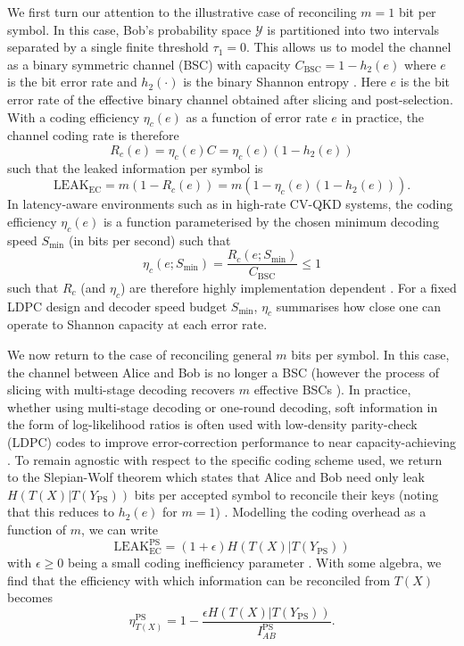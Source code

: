 ﻿\documentclass[12pt]{article}
\begin{document}
We first turn our attention to the illustrative case of reconciling $m = 1$ bit per symbol. In this case, Bob's probability space $\mathcal{Y}$ is partitioned into two intervals separated by a single finite threshold $\tau_1 = 0$. This allows us to model the channel as a binary symmetric channel (BSC) with capacity $C_\text{BSC} = 1 - h_2(e)$ where $e$ is the bit error rate and $h_2(\cdot)$ is the binary Shannon entropy \cite{Cover-2006}. Here $e$ is the bit error rate of the effective binary channel obtained after slicing and post-selection. With a coding efficiency $\eta_c(e)$ as a function of error rate $e$ in practice, the channel coding rate is therefore
\begin{equation}
  \label{eq: R_c}
  R_c(e) = \eta_c(e)C = \eta_c(e)(1 - h_2(e))
\end{equation}
such that the leaked information per symbol is 
\begin{equation}
\label{eq: LEAK EC}
\text{LEAK}_\text{EC} = m(1 - R_c(e)) = m(1 - \eta_c(e)(1 - h_2(e))).
\end{equation}
In latency-aware environments such as in high-rate CV-QKD systems, the coding efficiency $\eta_c(e)$ is a function parameterised by the chosen minimum decoding speed $S_\text{min}$ (in bits per second) such that
\begin{equation}
\label{eq: eta_c e Smin}
\eta_c(e; S_\text{min}) = \frac{R_c(e; S_\text{min})}{C_\text{BSC}} \leq 1
\end{equation}
such that $R_c$ (and $\eta_c$) are therefore highly implementation dependent \cite{Weerasinghe-2023}. For a fixed LDPC design and decoder speed budget $S_\text{min}$, $\eta_c$ summarises how close one can operate to Shannon capacity at each error rate.

We now return to the case of reconciling general $m$ bits per symbol. In this case, the channel between Alice and Bob is no longer a BSC (however the process of slicing with multi-stage decoding recovers $m$ effective BSCs \cite{VanAssche-2004}). In practice, whether using multi-stage decoding or one-round decoding, soft information in the form of log-likelihood ratios is often used with low-density parity-check (LDPC) codes to improve error-correction performance to near capacity-achieving \cite{Yang-2023a}. To remain agnostic with respect to the specific coding scheme used, we return to the Slepian-Wolf theorem which states that Alice and Bob need only leak $H(T(X)|T(Y_\text{PS}))$ bits per accepted symbol to reconcile their keys (noting that this reduces to $h_2(e)$ for $m = 1$) \cite{Slepian-1973}. Modelling the coding overhead as a function of $m$, we can write
\begin{equation}
  \label{eq: LEAK EC general m}
  \text{LEAK}_\text{EC}^\text{PS} = (1 + \epsilon)H(T(X)|T(Y_\text{PS}))
\end{equation}
with $\epsilon \geq 0$ being a small coding inefficiency parameter \cite{VanAssche-2004}. With some algebra, we find that the efficiency with which information can be reconciled from $T(X)$ becomes
\begin{equation}
  \label{eq: eta SW}
  \eta^\text{PS}_{T(X)} = 1 - \frac{\epsilon H(T(X)|T(Y_\text{PS}))}{I_{AB}^\text{PS}}.
\end{equation}
\end{document}
